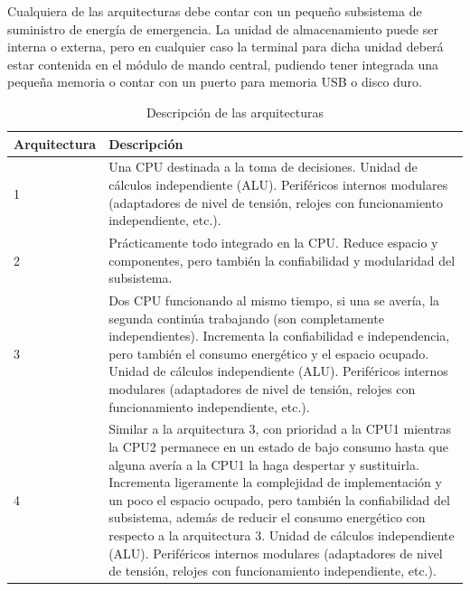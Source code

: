 Cualquiera de las arquitecturas debe contar con un pequeño subsistema de suministro de energía de emergencia. La unidad de almacenamiento puede ser interna o externa, pero en cualquier caso la terminal para dicha unidad deberá estar contenida en el módulo de mando central, pudiendo tener integrada una pequeña memoria o contar con un puerto para memoria USB o disco duro.

\begin{table}[H]
	\centering
	\caption{Descripción de las arquitecturas}
	\begin{tabular}{@{}|p{2.5cm}|p{11cm}|}
		\hline
		\textbf{Arquitectura} & \textbf{Descripción} \\
		\hline \hline
		1 & Una CPU destinada a la toma de decisiones.\newline{} Unidad de cálculos independiente (ALU).\newline{} Periféricos internos modulares (adaptadores de nivel de tensión, relojes con funcionamiento independiente, etc.). 
		\\ \hline
		2 & Prácticamente todo integrado en la CPU. Reduce espacio y componentes, pero también la confiabilidad y modularidad del subsistema.
		\\ \hline
		3 & Dos CPU funcionando al mismo tiempo, si una se avería, la segunda continúa trabajando (son completamente independientes). Incrementa la confiabilidad e independencia, pero también el consumo energético y el espacio ocupado.\newline{} Unidad de cálculos independiente (ALU).\newline{} Periféricos internos modulares (adaptadores de nivel de tensión, relojes con funcionamiento independiente, etc.). 
		\\ \hline
		4 & Similar a la arquitectura 3, con prioridad a la CPU1 mientras la CPU2 permanece en un estado de bajo consumo hasta que alguna avería a la CPU1 la haga despertar y sustituirla. Incrementa ligeramente la complejidad de implementación y un poco el espacio ocupado, pero también la confiabilidad del subsistema, además de reducir el consumo energético con respecto a la arquitectura 3.\newline{} Unidad de cálculos independiente (ALU).\newline{} Periféricos internos modulares (adaptadores de nivel de tensión, relojes con funcionamiento independiente, etc.).
		\\ \hline
	\end{tabular}		
	\label{tabla:arquidesc}
\end{table}

